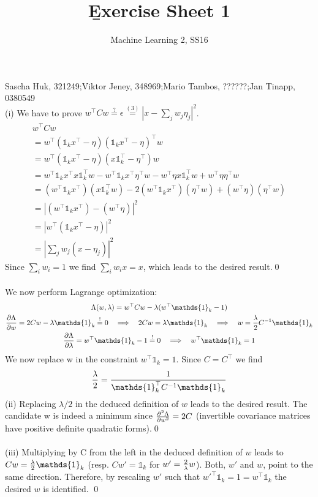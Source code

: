 \documentclass[a4paper]{article}
\newcommand{\eqs}[1]{ \stackrel{#1}{=}  }
\newcommand{\eqq}{  \overset{\text{!}}{=} }
\newcommand{\wt}{\w^\top}
\newcommand{\w}{w}
\newcommand{\1}{\mathds{1}}
\begin{document}
\title{\b{Exercise Sheet 1}}
\author{Machine Learning 2, SS16}

\maketitle

Sascha Huk, 321249;\quad Viktor Jeney, 348969;\quad Mario Tambos, ??????;\quad Jan Tinapp, 0380549\\


 
(i) We have to prove $\wt C\w \eqs{?} \epsilon \eqs{(3)} |x-\sum_jw_j\eta_j|^2	$. \\
\begin{gather*}
	\wt C\w
	\\ 
	= \wt (\1_kx^\top - \eta)(\1_kx^\top - \eta)^\top\w 
	\\
	= \wt (\1_kx^\top - \eta)(x\1_k^\top - \eta^\top)\w 
	\\	
	= \wt\1_kx^\top x\1_k^\top\w - \wt\1_kx^\top \eta^\top\w
	  - \wt\eta x\1_k^\top\w +\wt\eta \eta^\top\w
	\\
	= (\wt\1_kx^\top)(x\1_k^\top\w) - 2(\wt\1_kx^\top)(\eta^\top\w) + (\wt\eta)(\eta^\top\w)
	\\
	= |(\wt\1_kx^\top) - (\wt\eta)|^2
	\\
	= |\wt(\1_kx^\top - \eta)|^2
	\\
	= |\sum_jw_j(x - \eta_j)|^2	
\end{gather*}
Since $\sum_iw_i=1$ we find $\sum_iw_ix=x$, which leads to the desired result.\qed
\\
\\
We now perform Lagrange optimization:  
\begin{gather*}
	\Lambda(w,\lambda) = \wt Cw - \lambda(\wt\mathds{1}_k - 1)
	\\
	{\partial\Lambda \over \partial w} = 2C\w - \lambda\1_k \eqq 0 
	\quad\Longrightarrow\quad 
	2C\w = \lambda\1_k
	\quad\Longrightarrow\quad
	\w = {\lambda \over 2} C^{-1} \1_k
	\\
	{\partial\Lambda \over \partial \lambda} = \wt\1_k - 1 \eqq 0
	\quad\Longrightarrow\quad 
	\wt\1_k = 1 
\end{gather*}
We now replace w in the constraint $\wt\1_k = 1 $. Since $C=C^\top$ we find 
\begin{gather*}
	{\lambda \over 2} = {1\over \1_k^\top C^{-1}\1_k } 
\end{gather*}
(ii) Replacing $\lambda/2$ in the deduced definition of $w$ leads to the desired result. 
The candidate w is indeed a minimum since ${\partial^2\Lambda\over\partial{w}^2}=2C$ 
(invertible covariance matrices have positive definite quadratic forms).\qed\\
\\
(iii) Multiplying by C from the left in the deduced definition of $w$ leads to $Cw={\lambda\over 2}\1_k$ (resp. $Cw'=\1_k$ for
$w'={2\over\lambda}w$). Both, $w'$ and $w$, point to the same direction. 
Therefore, by rescaling $w'$ such that ${w'}^\top\1_k=1={w}^\top\1_k$ the desired $w$ is identified.
\qed      
\end{document}
